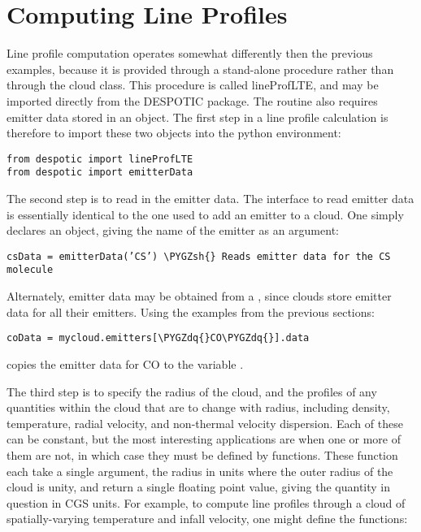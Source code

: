 \documentclass[letterpaper,10pt,english]{sphinxmanual}
\def\PYGZsh{\char`\#}
\def\PYGZdq{\char`\"}
\begin{document}
\section{Computing Line Profiles}
\label{functions:computing-line-profiles}
Line profile computation operates somewhat differently then the
previous examples, because it is provided through a stand-alone
procedure rather than through the cloud class. This procedure is
called lineProfLTE, and may be imported directly from the DESPOTIC
package. The routine also requires emitter data stored in an
 object. The first step in a line profile calculation is
therefore to import these two objects into the python environment:

\begin{Verbatim}[commandchars=\\\{\}]
from despotic import lineProfLTE
from despotic import emitterData
\end{Verbatim}

The second step is to read in the emitter data. The interface to read
emitter data is essentially identical to the one used to add an
emitter to a cloud. One simply declares an  object,
giving the name of the emitter as an argument:

\begin{Verbatim}[commandchars=\\\{\}]
csData = emitterData(’CS’) \PYGZsh{} Reads emitter data for the CS molecule
\end{Verbatim}

Alternately, emitter data may be obtained from a , since clouds
store emitter data for all their emitters. Using the examples from the
previous sections:

\begin{Verbatim}[commandchars=\\\{\}]
coData = mycloud.emitters[\PYGZdq{}CO\PYGZdq{}].data
\end{Verbatim}

copies the emitter data for CO to the variable .

The third step is to specify the radius of the cloud, and the profiles
of any quantities within the cloud that are to change with radius,
including density, temperature, radial velocity, and non-thermal
velocity dispersion. Each of these can be constant, but the most
interesting applications are when one or more of them are not, in
which case they must be defined by functions. These function each take
a single argument, the radius in units where the outer radius of the
cloud is unity, and return a single floating point value, giving the
quantity in question in CGS units. For example, to compute line
profiles through a cloud of spatially-varying temperature and infall
velocity, one might define the functions:
\end{document}
